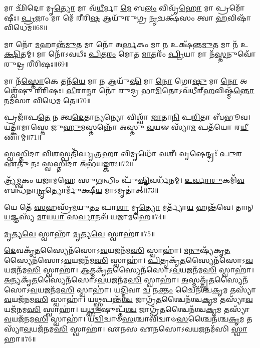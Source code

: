 𑌮𑌾 𑌛𑌿᳴𑌦𑍋 𑌮𑍃\-\ul{𑌤𑍍𑌯𑍋} 𑌮𑌾 𑌵᳴\-\ul{𑌧𑍀}\-𑌰𑍍𑌮𑌾 \ul{𑌮𑍇} 𑌬\-\ul{𑌲𑌂} 𑌵𑌿𑌵𑍃᳴\-\ul{𑌹𑍋} 𑌮𑌾 𑌪𑍍𑌰𑌮𑍋᳴𑌷𑍀𑌃। 
\-\ul{𑌪𑍍𑌰}\-𑌜𑌾𑌂 𑌮𑌾 𑌮𑍇᳴ 𑌰𑍀𑌰𑌿\-\ul{𑌷} 𑌆𑌯𑍁᳴𑌰𑍁𑌗𑍍𑌰 \ul{𑌨𑍃}\-𑌚𑌕𑍍𑌷᳴𑌸𑌂 𑌤𑍍𑌵𑌾 \ul{𑌹}\-𑌵𑌿𑌷𑌾᳴ 𑌵𑌿𑌧𑍇𑌮॥68॥
\anuvakamend
 
𑌮𑌾 𑌨𑍋᳴ \ul{𑌮}\-𑌹𑌾𑌨𑍍𑌤᳴\-\ul{𑌮𑍁}\-𑌤 𑌮𑌾 𑌨𑍋᳴ 𑌅\-\ul{𑌰𑍍𑌭}\-𑌕𑌂 𑌮𑌾 \ul{𑌨} 𑌉𑌕𑍍𑌷᳴𑌨𑍍𑌤\-\ul{𑌮𑍁}\-𑌤 𑌮𑌾 𑌨᳴ 𑌉\-\ul{𑌕𑍍𑌷𑌿}\-𑌤𑌮𑍍। 
𑌮𑌾 𑌨𑍋᳴𑌽𑌵𑌧𑍀𑌃 \ul{𑌪𑌿}\-𑌤\-\ul{𑌰𑌂} 𑌮𑍋𑌤 \ul{𑌮𑌾}\-𑌤𑌰𑌂᳴ \ul{𑌪𑍍𑌰𑌿}\-𑌯𑌾 𑌮𑌾 𑌨᳴\-\ul{𑌸𑍍𑌤}\-𑌨𑍁𑌵𑍋᳴ 𑌰𑍁𑌦𑍍𑌰 𑌰𑍀𑌰𑌿𑌷𑌃॥69॥
\anuvakamend

𑌮𑌾 𑌨᳴\-\ul{𑌸𑍍𑌤𑍋}\-𑌕𑍇 𑌤𑌨᳴\-\ul{𑌯𑍇} 𑌮𑌾 \ul{𑌨} 𑌆𑌯𑍁᳴\-\ul{𑌷𑌿} 𑌮𑌾 \ul{𑌨𑍋} 𑌗𑍋\-\ul{𑌷𑍁} 𑌮𑌾 \ul{𑌨𑍋} 𑌅𑌶𑍍𑌵𑍇᳴𑌷𑍁 𑌰𑍀𑌰𑌿𑌷𑌃। 
\-\ul{𑌵𑍀}\-𑌰𑌾𑌨𑍍𑌮𑌾 𑌨𑍋᳴ 𑌰𑍁𑌦𑍍𑌰 𑌭𑌾\-\ul{𑌮𑌿}\-𑌤𑍋𑌽𑌵᳴𑌧𑍀𑌰𑍍‌\-\ul{𑌹}\-𑌵𑌿𑌷𑍍𑌮᳴\-\ul{𑌨𑍍𑌤𑍋} 𑌨𑌮᳴𑌸𑌾 𑌵𑌿𑌧𑍇𑌮 𑌤𑍇॥70॥
\anuvakamend 

𑌪𑍍𑌰𑌜𑌾᳴𑌪\-\ul{𑌤𑍇} 𑌨 𑌤𑍍𑌵\-\ul{𑌦𑍇}\-𑌤𑌾\-\ul{𑌨𑍍𑌯}\-𑌨𑍍𑌯𑍋 𑌵𑌿𑌶𑍍𑌵𑌾᳴ \ul{𑌜𑌾}\-𑌤𑌾\-\ul{𑌨𑌿} 𑌪\-\ul{𑌰𑌿}\-𑌤𑌾 𑌬᳴𑌭𑍂𑌵। 
𑌯𑌤𑍍𑌕𑌾᳴𑌮𑌾𑌸𑍍𑌤𑍇 𑌜𑍁\-\ul{𑌹𑍁}\-𑌮𑌸𑍍𑌤𑌨𑍍𑌨𑍋᳴ 𑌅𑌸𑍍𑌤𑍁 \ul{𑌵}\-𑌯𑍟 𑌸𑍍𑌯𑌾᳴\-\ul{𑌮} 𑌪𑌤᳴𑌯𑍋 𑌰\-\ul{𑌯𑍀}\-𑌣𑌾𑌮𑍍॥71॥%
\anuvakamend 

\-\ul{𑌸𑍍𑌵}\-\-\ul{𑌸𑍍𑌤𑌿}\-𑌦𑌾 \ul{𑌵𑌿}\-𑌶𑌸𑍍𑌪𑌤𑌿᳴𑌰𑍍𑌵𑍃\-\ul{𑌤𑍍𑌰}\-𑌹𑌾 𑌵𑌿𑌮𑍃𑌧𑍋᳴ \ul{𑌵}\-𑌶𑍀। 
𑌵𑍃𑌷𑍇𑌨𑍍𑌦𑍍𑌰𑌃᳴ \ul{𑌪𑍁}\-𑌰 𑌏᳴𑌤𑍁 𑌨𑌃 𑌸𑍍𑌵\-\ul{𑌸𑍍𑌤𑌿}\-𑌦𑌾 𑌅᳴𑌭𑌯\-\ul{𑌙𑍍𑌕}\-𑌰𑌃॥72॥
\anuvakamend 

𑌤𑍍𑌰𑍍𑌯᳴𑌮𑍍𑌬𑌕𑌂 𑌯𑌜𑌾𑌮𑌹𑍇 𑌸𑍁\-\ul{𑌗}\-𑌨𑍍𑌧𑌿𑌂 𑌪𑍁᳴\-\ul{𑌷𑍍𑌟𑌿}\-𑌵𑌰𑍍𑌧᳴𑌨𑌮𑍍। 
\-\ul{𑌉}\-\-\ul{𑌰𑍍𑌵𑌾}\-\-\ul{𑌰𑍁}\-𑌕𑌮𑌿᳴\-\ul{𑌵} 𑌬𑌨𑍍𑌧᳴𑌨𑌾\-\ul{𑌨𑍍𑌮𑍃}\-𑌤𑍍𑌯𑍋𑌰𑍍𑌮𑍁᳴𑌕𑍍𑌷𑍀\-\ul{𑌯} 𑌮𑌾𑌽𑌮𑍃𑌤𑌾॑𑌤𑍍॥73॥
\anuvakamend 

𑌯𑍇 𑌤𑍇᳴ \ul{𑌸}\-𑌹𑌸𑍍𑌰᳴\-\ul{𑌮}\-𑌯𑍁\-\ul{𑌤𑌂} 𑌪𑌾\-\ul{𑌶𑌾} 𑌮𑍃\-\ul{𑌤𑍍𑌯𑍋} 𑌮𑌰𑍍𑌤𑍍𑌯𑌾᳴\-\ul{𑌯} 𑌹𑌨𑍍𑌤᳴𑌵𑍇। 
𑌤𑌾𑌨𑍍 \ul{𑌯}\-𑌜𑍍𑌞𑌸𑍍𑌯᳴ \ul{𑌮𑌾}\-𑌯\-\ul{𑌯𑌾} 𑌸\-\ul{𑌰𑍍𑌵𑌾}\-𑌨𑌵᳴ 𑌯𑌜𑌾𑌮𑌹𑍇॥74॥\anuvakamend
 
\-\ul{𑌮𑍃}\-𑌤𑍍𑌯\-\ul{𑌵𑍇} 𑌸𑍍𑌵𑌾𑌹𑌾᳴ \ul{𑌮𑍃}\-𑌤𑍍𑌯\-\ul{𑌵𑍇} 𑌸𑍍𑌵𑌾𑌹𑌾॑॥75॥%
\anuvakamend 

\-\ul{𑌦𑍇}\-𑌵𑌕𑍃᳴\-\ul{𑌤}\-𑌸𑍍𑌯𑍈𑌨᳴𑌸𑍋𑌽\-\ul{𑌵}\-𑌯𑌜𑌨᳴𑌮\-\ul{𑌸𑌿} 𑌸𑍍𑌵𑌾𑌹𑌾॑। 
\-\ul{𑌮}\-\-\ul{𑌨𑍁}\-𑌷𑍍𑌯᳴𑌕𑍃\-\ul{𑌤}\-𑌸𑍍𑌯𑍈𑌨᳴𑌸𑍋\-𑌽\-\ul{𑌵}\-𑌯𑌜𑌨᳴𑌮\-\ul{𑌸𑌿} 𑌸𑍍𑌵𑌾𑌹𑌾॑। 
\-\ul{𑌪𑌿}\-𑌤𑍃𑌕𑍃᳴\-\ul{𑌤}\-𑌸𑍍𑌯𑍈𑌨᳴𑌸𑍋\-𑌽\-\ul{𑌵}\-𑌯𑌜𑌨᳴𑌮\-\ul{𑌸𑌿} 𑌸𑍍𑌵𑌾𑌹𑌾॑। 
\-\ul{𑌆}\-𑌤𑍍𑌮𑌕𑍃᳴\-\ul{𑌤}\-𑌸𑍍𑌯𑍈𑌨᳴𑌸𑍋\-𑌽\-\ul{𑌵}\-𑌯𑌜𑌨᳴𑌮\-\ul{𑌸𑌿} 𑌸𑍍𑌵𑌾𑌹𑌾॑। 
\-\ul{𑌅}\-𑌨𑍍𑌯𑌕𑍃᳴\-\ul{𑌤}\-𑌸𑍍𑌯𑍈𑌨᳴𑌸𑍋\-𑌽\-\ul{𑌵}\-𑌯𑌜𑌨᳴𑌮\-\ul{𑌸𑌿} 𑌸𑍍𑌵𑌾𑌹𑌾॑। 
\-\ul{𑌅}\-𑌸𑍍𑌮𑌤𑍍𑌕𑍃᳴\-\ul{𑌤}\-𑌸𑍍𑌯𑍈𑌨᳴𑌸𑍋\-𑌽\-\ul{𑌵}\-𑌯𑌜𑌨᳴𑌮\-\ul{𑌸𑌿} 𑌸𑍍𑌵𑌾𑌹𑌾॑। 
𑌯\-\ul{𑌦𑍍𑌦𑌿}\-𑌵𑌾 \ul{𑌚} 𑌨\-\ul{𑌕𑍍𑌤𑌂} 𑌚𑍈𑌨᳴𑌶𑍍𑌚\-\ul{𑌕𑍃}\-𑌮 𑌤𑌸𑍍𑌯𑌾᳴\-\ul{𑌵}\-𑌯𑌜᳴𑌨𑌮\-\ul{𑌸𑌿} 𑌸𑍍𑌵𑌾𑌹𑌾॑। 
𑌯\-\ul{𑌥𑍍𑌸𑍍𑌵}\-𑌪𑌨𑍍𑌤᳴\-\ul{𑌶𑍍𑌚} 𑌜𑌾𑌗𑍍𑌰᳴\-\ul{𑌤}\-𑌶𑍍𑌚𑍈𑌨᳴𑌶𑍍𑌚\-\ul{𑌕𑍃}\-𑌮 𑌤𑌸𑍍𑌯𑌾᳴\-\ul{𑌵}\-𑌯𑌜᳴𑌨𑌮\-\ul{𑌸𑌿} 𑌸𑍍𑌵𑌾𑌹𑌾॑। 
𑌯\-\ul{𑌥𑍍𑌸𑍁}\-𑌷𑍁𑌪𑍍𑌤᳴\-\ul{𑌶𑍍𑌚} 𑌜𑌾𑌗𑍍𑌰᳴\-\ul{𑌤}\-𑌶𑍍𑌚𑍈𑌨᳴𑌶𑍍𑌚\-\ul{𑌕𑍃}\-𑌮 𑌤𑌸𑍍𑌯𑌾᳴\-\ul{𑌵}\-𑌯𑌜᳴𑌨𑌮\-\ul{𑌸𑌿} 𑌸𑍍𑌵𑌾𑌹𑌾॑। 
𑌯\-\ul{𑌦𑍍𑌵𑌿}\-𑌦𑍍𑌵𑌾𑍞\-\ul{𑌸}\-𑌶𑍍𑌚𑌾𑌵𑌿᳴𑌦𑍍𑌵𑌾𑍞\-\ul{𑌸}\-𑌶𑍍𑌚𑍈𑌨᳴𑌶𑍍𑌚\-\ul{𑌕𑍃}\-𑌮 𑌤𑌸𑍍𑌯𑌾᳴\-\ul{𑌵}\-𑌯𑌜᳴𑌨𑌮\-\ul{𑌸𑌿} 𑌸𑍍𑌵𑌾𑌹𑌾॑। 
𑌏𑌨𑌸 𑌏𑌨𑌸𑍋𑌽𑌵𑌯𑌜𑌨𑌮᳴𑌸𑌿 \ul{𑌸𑍍𑌵𑌾}\-𑌹𑌾॥76॥\anuvakamend

